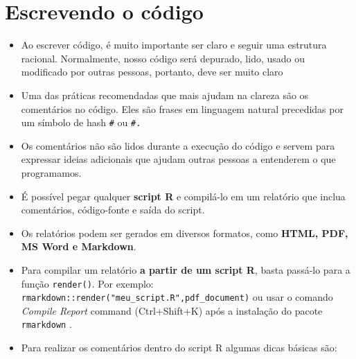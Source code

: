 \documentclass[
  letterpaper,
  DIV=11,
  numbers=noendperiod]{scrartcl}
\begin{document}
\section{Escrevendo o código}\label{escrevendo-o-cuxf3digo}

\begin{itemize}
\item
  Ao escrever código, é muito importante ser claro e seguir uma
  estrutura racional. Normalmente, nosso código será depurado, lido,
  usado ou modificado por outras pessoas, portanto, deve ser muito claro
\item
  Uma das práticas recomendadas que mais ajudam na clareza são os
  comentários no código. Eles são frases em linguagem natural precedidas
  por um símbolo de hash \texttt{\#} ou \texttt{\#\textquotesingle{}.}
\item
  Os comentários não são lidos durante a execução do código e servem
  para expressar ideias adicionais que ajudam outras pessoas a
  entenderem o que programamos.
\item
  É possível pegar qualquer \textbf{script R} e compilá-lo em um
  relatório que inclua comentários, código-fonte e saída do script.
\item
  Os relatórios podem ser gerados em diversos formatos, como
  \textbf{HTML, PDF, MS Word e Markdown}.
\item
  Para compilar um relatório \textbf{a partir de um script R}, basta
  passá-lo para a função \texttt{render()}. Por exemplo:
  \texttt{rmarkdown::render("meu\_script.R",pdf\_document)} ou usar o
  comando \emph{Compile Report} command (Ctrl+Shift+K) após a instalação
  do pacote \texttt{rmarkdown} .
\item
  Para realizar os comentários dentro do script R algumas dicas básicas
  são:
\end{itemize}
\end{document}
